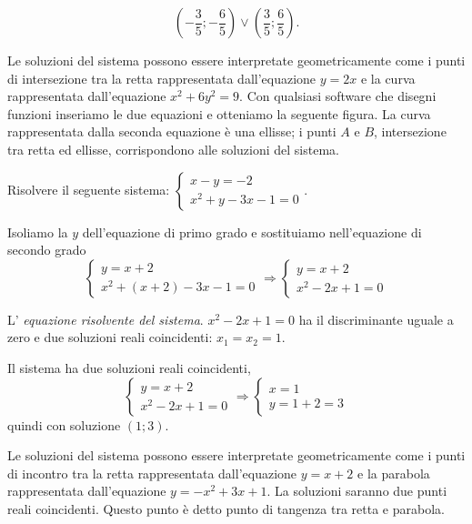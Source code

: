 \begin{exrig}
\begin{esempio}
\begin{itemize*}
\[\left(-\frac 3 5;-\frac 6 5\right)\vee \left(\frac 3 5;\frac 6 5\right).\]
\end{itemize*}
\begin{multicols}{2}
Le soluzioni del sistema possono essere interpretate geometricamente come i punti di intersezione tra la retta rappresentata dall'equazione $y=2x$ e la curva rappresentata dall'equazione $x^2+6y^2=9$. Con qualsiasi software che disegni funzioni inseriamo le due equazioni e otteniamo la seguente figura.
La curva rappresentata dalla seconda equazione è una ellisse; i punti $ A $ e $ B $, intersezione tra retta ed ellisse, corrispondono alle soluzioni del sistema.
\begin{center}

\end{center}
 \end{multicols}
\end{esempio}

\begin{esempio}
Risolvere il seguente sistema: $\left\{\begin{array}{l}x-y=-2 \\x^2+y-3x-1=0\end{array}\right..$

Isoliamo la $y$ dell'equazione di primo grado e sostituiamo nell'equazione di secondo grado 
\[\left\{\begin{array}{l}y=x+2 \\
x^2+\left(x+2\right)-3x-1=0\end{array}\right. 
\Rightarrow\left\{\begin{array}{l}y=x+2 \\
x^2-2x+1=0\end{array}\right.\]

L' \emph{equazione risolvente del sistema}. $x^2-2x+1=0$ ha il discriminante uguale a zero e due soluzioni reali coincidenti: $x_1=x_2=1$.

Il sistema ha due soluzioni reali coincidenti, 
\[\left\{\begin{array}{l}y=x+2 \\x^2-2x+1=0\end{array}\right. 
\Rightarrow\left\{\begin{array}{l}x=1 \\
y=1+2=3\end{array}\right.\] 
quindi con soluzione $(1;3)$.
\begin{multicols}{2}
Le soluzioni del sistema possono essere interpretate geometricamente come i punti di incontro tra la retta rappresentata dall'equazione $y=x+2$ e la parabola rappresentata dall'equazione $y=-x^2+3x+1$. La soluzioni saranno due punti reali coincidenti. Questo punto è detto punto di tangenza tra retta e parabola.
\begin{center}

\end{center}
 \end{multicols}
\end{esempio}


\end{exrig}

